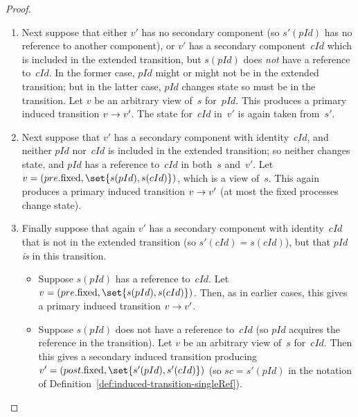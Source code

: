 \begin{proof}
\begin{enumerate}
\begin{enumerate}
\item Next suppose that either $v'$ has no secondary component (so $s'(pId)$
  has no reference to another component), or $v'$ has a secondary
  component~$cId$ which is included in the extended transition, but $s(pId)$
  does \emph{not} have a reference to~$cId$.  In the former case, $pId$ might
  or might not be in the extended transition; but in the latter case, $pId$
  changes state so must be in the transition.  Let $v$ be an arbitrary view
  of~$s$ for~$pId$.  This produces a primary induced transition $v \stackrel{}\rightarrow
  v'$.  The state for~$cId$ in~$v'$ is again taken from~$s'$. 


\item Next suppose that $v'$ has a secondary component with identity~$cId$,
  and neither $pId$ nor~$cId$ is included in the extended transition; so
  neither changes state, and $pId$ has a reference to~$cId$ in both~$s$
  and~$v'$.  Let $v = (pre.\fixed, \set{s(pId), s(cId)})$, which is a view
  of~$s$.  This again produces a primary induced transition $v \stackrel{}\rightarrow v'$ (at
  most the fixed processes change state).

\item Finally suppose that again $v'$ has a secondary component with
  identity~$cId$ that is not in the extended transition (so $s'(cId) =
  s(cId)$), but that $pId$ \emph{is} in this transition.
  \begin{itemize}
  \item Suppose $s(pId)$ has a reference to~$cId$.  Let $v =
    (pre.\fixed,\linebreak[1] \set{s(pId), s(cId)})$.  Then, as in earlier
    cases, this gives a primary induced transition $v \stackrel{}\rightarrow v'$.

  \item Suppose $s(pId)$ does not have a reference to~$cId$ (so $pId$ acquires
    the reference in the transition).  Let $v$ be an arbitrary view of~$s$
    for~$cId$.  Then this gives a secondary induced transition producing~$v' =
    (post.\fixed, \set{s'(pId), s'(cId)})$ (so $sc = s'(pId)$ in the notation
    of Definition~\ref{def:induced-transition-singleRef}).
  \end{itemize}
\end{enumerate}


\end{enumerate}
\end{proof}
